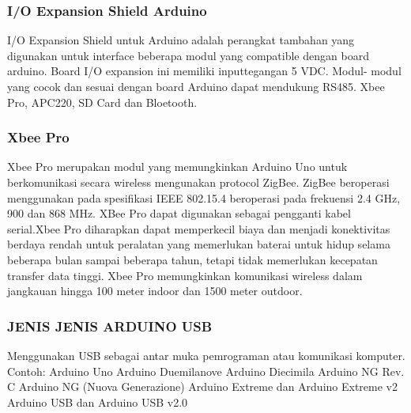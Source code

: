 \subsubsection  {I/O Expansion Shield Arduino}
I/O Expansion Shield untuk Arduino adalah perangkat tambahan yang digunakan untuk interface beberapa modul yang compatible dengan board arduino. Board I/O expansion ini memiliki inputtegangan 5 VDC. Modul- modul yang cocok dan sesuai dengan board Arduino dapat mendukung RS485. Xbee Pro, APC220, SD Card dan Bloetooth.

\subsubsection {Xbee Pro}
 Xbee Pro merupakan modul yang memungkinkan Arduino Uno untuk berkomunikasi secara wireless
mengunakan protocol ZigBee. ZigBee beroperasi menggunakan pada spesifikasi IEEE 802.15.4 beroperasi pada frekuensi
2.4 GHz, 900 dan 868 MHz. XBee Pro dapat digunakan sebagai pengganti kabel serial.Xbee Pro diharapkan dapat memperkecil biaya dan menjadi
konektivitas berdaya rendah untuk peralatan yang memerlukan baterai untuk hidup selama beberapa bulan sampai beberapa tahun, tetapi tidak memerlukan kecepatan transfer data tinggi. Xbee Pro memungkinkan komunikasi wireless dalam jangkauan hingga 100 meter indoor dan 1500 meter outdoor.


\subsubsection {JENIS JENIS ARDUINO USB}
Menggunakan USB sebagai antar muka pemrograman atau komunikasi komputer. Contoh:
Arduino Uno
Arduino Duemilanove
Arduino Diecimila
Arduino NG Rev. C
Arduino NG (Nuova Generazione)
Arduino Extreme dan Arduino Extreme v2
Arduino USB dan Arduino USB v2.0 
